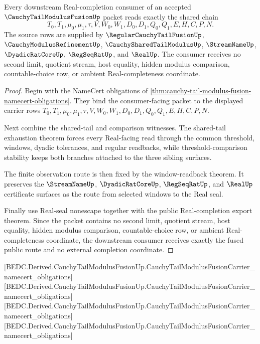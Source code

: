 \begin{theorem}
\label{thm:cauchy-tail-modulus-fusion-mature-readback-coverage}
Every downstream Real-completion consumer of an accepted $\CauchyTailModulusFusionUp$ packet reads exactly the shared chain
$$
T_0,T_1,\mu_0,\mu_1,\tau,V,W_0,W_1,D_0,D_1,Q_0,Q_1,E,H,C,P,N.
$$
The source rows are supplied by $\RegularCauchyTailFusionUp$, $\CauchyModulusRefinementUp$, $\CauchySharedTailModulusUp$, $\StreamNameUp$, $\DyadicRatCoreUp$, $\RegSeqRatUp$, and $\RealUp$. The consumer receives no second limit, quotient stream, host equality, hidden modulus comparison, countable-choice row, or ambient Real-completeness coordinate.
\end{theorem}
\begin{proof}
Begin with the NameCert obligations of \autoref{thm:cauchy-tail-modulus-fusion-namecert-obligations}. They bind the consumer-facing packet to the displayed carrier rows $T_0,T_1,\mu_0,\mu_1,\tau,V,W_0,W_1,D_0,D_1,Q_0,Q_1,E,H,C,P,N$.

Next combine the shared-tail and comparison witnesses. The shared-tail exhaustion theorem forces every Real-facing read through the common threshold, windows, dyadic tolerances, and regular readbacks, while threshold-comparison stability keeps both branches attached to the three sibling surfaces.

The finite observation route is then fixed by the window-readback theorem. It preserves the $\StreamNameUp$, $\DyadicRatCoreUp$, $\RegSeqRatUp$, and $\RealUp$ certificate surfaces as the route from selected windows to the Real seal.

Finally use Real-seal nonescape together with the public Real-completion export theorem. Since the packet contains no second limit, quotient stream, host equality, hidden modulus comparison, countable-choice row, or ambient Real-completeness coordinate, the downstream consumer receives exactly the fused public route and no external completion coordinate.
\end{proof}

[BEDC.Derived.CauchyTailModulusFusionUp.CauchyTailModulusFusionCarrier\_namecert\_obligations]
[BEDC.Derived.CauchyTailModulusFusionUp.CauchyTailModulusFusionCarrier\_namecert\_obligations]
[BEDC.Derived.CauchyTailModulusFusionUp.CauchyTailModulusFusionCarrier\_namecert\_obligations]
[BEDC.Derived.CauchyTailModulusFusionUp.CauchyTailModulusFusionCarrier\_namecert\_obligations]

